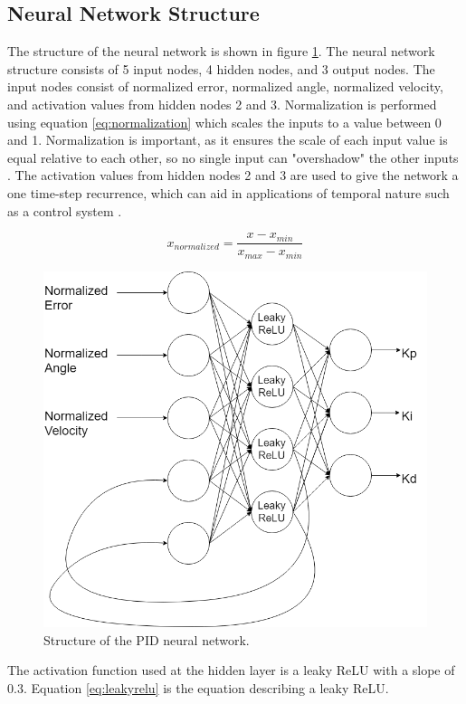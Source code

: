 \documentclass[letterpaper,12pt]{article}
\begin{document}
\subsection{Neural Network Structure}
The structure of the neural network is shown in figure \ref{fig:nn_structure}. The neural network structure consists of 5 input nodes, 4 hidden nodes, and 3 output nodes. The input nodes consist of normalized error, normalized angle, normalized velocity, and activation values from hidden nodes 2 and 3. Normalization is performed using equation \ref{eq:normalization} which scales the inputs to a value between 0 and 1. Normalization is important, as it ensures the scale of each input value is equal relative to each other, so no single input can "overshadow" the other inputs \cite{}. The activation values from hidden nodes 2 and 3 are used to give the network a one time-step recurrence, which can aid in applications of temporal nature such as a control system \cite{j.gunther}.

\begin{equation}
	\label{eq:normalization}
	x_{normalized} = \frac{x - x_{min}}{x_{max} - x_{min}}
\end{equation}

\begin{figure}[H]
\centering \includegraphics[width=0.8\columnwidth]{nn_structure.png}
\caption{\label{fig:nn_structure}Structure of the PID neural network.}
\end{figure}

The activation function used at the hidden layer is a leaky ReLU with a slope of $0.3$. Equation \ref{eq:leakyrelu} is the equation describing a leaky ReLU.
\end{document}
